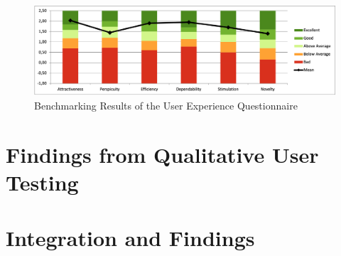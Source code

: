 \begin{figure}[htb]
	\includegraphics[width=\textwidth]{figures/ueq-2.png}
  \caption{Benchmarking Results of the User Experience Questionnaire}
  \label{fig:ueq-2}
\end{figure}

\section{Findings from Qualitative User Testing}
\label{sec:result:testing}


\section{Integration and Findings}
\label{sec:result:findings}

